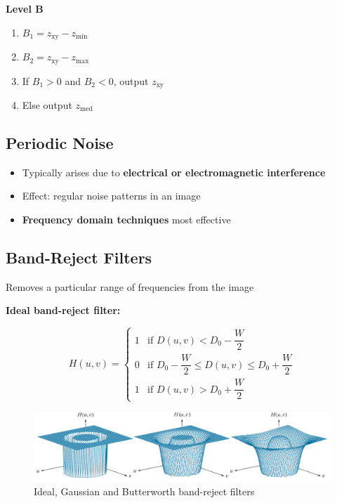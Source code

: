 \textbf{Level B}

\begin{enumerate}
  \item $B_1 = z_\text{xy} - z_\text{min}$
  \item $B_2 = z_\text{xy} - z_\text{max}$
  \item If $B_1 > 0$ and $B_2 < 0$, output $z_\text{xy}$
  \item Else output $z_\text{med}$
\end{enumerate}

\subsection*{Periodic Noise}

\begin{itemize}
  \item Typically arises due to \textbf{electrical or electromagnetic
    interference}
  \item Effect: regular noise patterns in an image
  \item \textbf{Frequency domain techniques} most effective
\end{itemize}

\subsection*{Band-Reject Filters}

Removes a particular range of frequencies from the image

\textbf{Ideal band-reject filter:}

\begin{equation*}
  H(u,v)=
  \begin{cases}
    1 & \text{if } D(u,v) < D_0 - \dfrac{W}{2}\\
    0 & \text{if } D_0 - \dfrac{W}{2} \le D(u,v) \le D_0 + \dfrac{W}{2}\\
    1 & \text{if } D(u,v) > D_0 + \dfrac{W}{2}
  \end{cases}
\end{equation*}

\begin{figure}[H]
  \includegraphics[width=\linewidth]{images/band_reject_filters.png}
  \caption{Ideal, Gaussian and Butterworth band-reject filters}
\end{figure}


